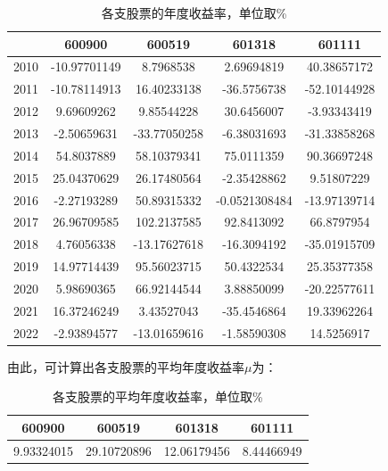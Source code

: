 \documentclass[UTF8]{ctexart}
\numberwithin{figure}{section}
\numberwithin{table}{section}
\numberwithin{equation}{section}
\begin{document}
    \begin{table}[H]
        \centering
        \begin{tabular}{|c|c|c|c|c|}
        \hline
            & 600900       & 600519       & 601318        & 601111       \\ \hline
        2010 & -10.97701149 & 8.7968538    & 2.69694819    & 40.38657172  \\ \hline
        2011 & -10.78114913 & 16.40233138  & -36.5756738   & -52.10144928 \\ \hline
        2012 & 9.69609262   & 9.85544228   & 30.6456007   & -3.93343419  \\ \hline
        2013 & -2.50659631  & -33.77050258 & -6.38031693   & -31.33858268 \\ \hline
        2014 & 54.8037889   & 58.10379341  & 75.0111359    & 90.36697248  \\ \hline
        2015 & 25.04370629  & 26.17480564  & -2.35428862  & 9.51807229   \\ \hline
        2016 & -2.27193289  & 50.89315332  & -0.0521308484 & -13.97139714 \\ \hline
        2017 & 26.96709585  & 102.2137585  & 92.8413092    & 66.8797954   \\ \hline
        2018 & 4.76056338   & -13.17627618 & -16.3094192  & -35.01915709 \\ \hline
        2019 & 14.97714439  & 95.56023715  & 50.4322534   & 25.35377358  \\ \hline
        2020 & 5.98690365   & 66.92144544  & 3.88850099    & -20.22577611 \\ \hline
        2021 & 16.37246249  & 3.43527043   & -35.4546864   & 19.33962264  \\ \hline
        2022 & -2.93894577  & -13.01659616 & -1.58590308   & 14.5256917   \\ \hline
        \end{tabular}
        \caption{各支股票的年度收益率，单位取\%}
    \end{table}

    由此，可计算出各支股票的平均年度收益率$\mu$为：
    \begin{table}[H]
        \centering
        \begin{tabular}{|c|c|c|c|}
        \hline
        600900     & 600519      & 601318      & 601111     \\ \hline
        9.93324015 & 29.10720896 & 12.06179456 & 8.44466949 \\ \hline
        \end{tabular}
        \caption{各支股票的平均年度收益率，单位取\%}
    \end{table}
\end{document}
